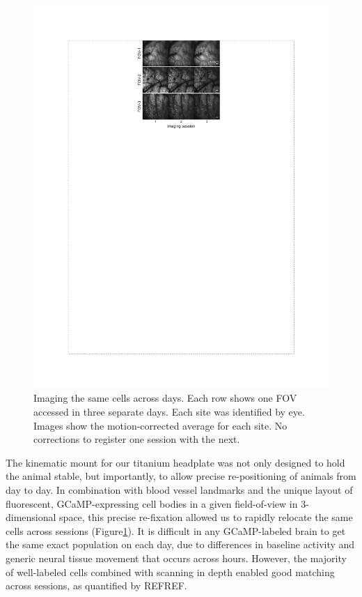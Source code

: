 \begin{figure}[t!]
    \includegraphics[width=\textwidth]{figures/chapter_2/fig_2-8_multiday_imaging/fig_2-8_multiday_imaging.pdf}
    \vspace{.1in}
    \caption[Multi-day imaging]{Imaging the same cells across days. Each row shows one FOV accessed in three separate days. Each site was identified by eye. Images show the motion-corrected average for each site. No corrections to register one session with the next.    
    \label{fig:multiday_imaging}}
\end{figure}

The kinematic mount for our titanium headplate was not only designed to hold the animal stable, but importantly, to allow precise re-positioning of animals from day to day. In combination with blood vessel landmarks and the unique layout of fluorescent, GCaMP-expressing cell bodies in a given field-of-view in 3-dimensional space, this precise re-fixation allowed us to rapidly relocate the same cells across sessions (Figure\ref{fig:multiday_imaging}). It is difficult in any GCaMP-labeled brain to get the same exact population on each day, due to differences in baseline activity and generic neural tissue movement that occurs across hours. However, the majority of well-labeled cells combined with scanning in depth enabled good matching across sessions, as quantified by REFREF. 

